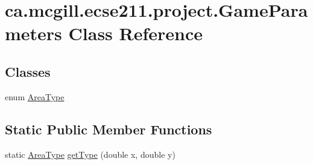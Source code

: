 \hypertarget{classca_1_1mcgill_1_1ecse211_1_1project_1_1_game_parameters}{}\section{ca.\+mcgill.\+ecse211.\+project.\+Game\+Parameters Class Reference}
\label{classca_1_1mcgill_1_1ecse211_1_1project_1_1_game_parameters}
\subsection*{Classes}
\begin{DoxyCompactItemize}
\item 
enum \hyperlink{enumca_1_1mcgill_1_1ecse211_1_1project_1_1_game_parameters_1_1_area_type}{Area\+Type}
\end{DoxyCompactItemize}
\subsection*{Static Public Member Functions}
\begin{DoxyCompactItemize}
\item 
static \hyperlink{enumca_1_1mcgill_1_1ecse211_1_1project_1_1_game_parameters_1_1_area_type}{Area\+Type} \hyperlink{classca_1_1mcgill_1_1ecse211_1_1project_1_1_game_parameters_afa2d71de18f6276782a702d7b74066e3}{get\+Type} (double x, double y)
\end{DoxyCompactItemize}
